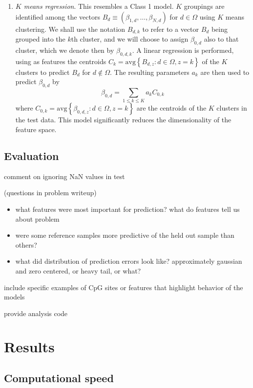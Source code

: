 \documentclass{article} %
\begin{document}
\begin{enumerate}
\item \emph{$K$ means regression}. This resembles a Class 1 model. $K$ groupings are identified among the vectors $B_d \equiv \left(\beta_{1,d},\dots,\beta_{N,d}\right)$ for $d\in\Omega$ using $K$ means clustering. We shall use the notation $B_{d,k}$ to refer to a vector $B_d$ being grouped into the $k$th cluster, and we will choose to assign $\beta_{0,d}$ also to that cluster, which we denote then by $\beta_{0,d,k}$. A linear regression is performed, using as features the centroids $C_k = \text{avg}\left\{B_{d,z} : d \in \Omega, z = k\right\}$ of the $K$ clusters to predict $B_{d}$ for $d \notin \Omega$. The resulting parameters $a_k$ are then used to predict $\beta_{0,d}$ by
\[ \beta_{0,d} = \sum_{1 \leq k \leq K} a_k C_{0,k}\]
where $C_{0,k} = \text{avg}\left\{\beta_{0,d,z} : d \in \Omega, z = k\right\}$ are the centroids of the $K$ clusters in the test data. This model significantly reduces the dimensionality of the feature space.
\end{enumerate}

\subsection{Evaluation}

comment on ignoring NaN values in test

(questions in problem writeup)
\begin{itemize}
\item what features were most important for prediction? what do features tell us about problem
\item were some reference samples more predictive of the held out sample than others?
\item what did distribution of prediction errors look like? approximately gaussian and zero centered, or heavy tail, or what?
\end{itemize}

include specific examples of CpG sites or features that highlight behavior of the models

provide analysis code

\section{Results}

\subsection{Computational speed}
\end{document}
